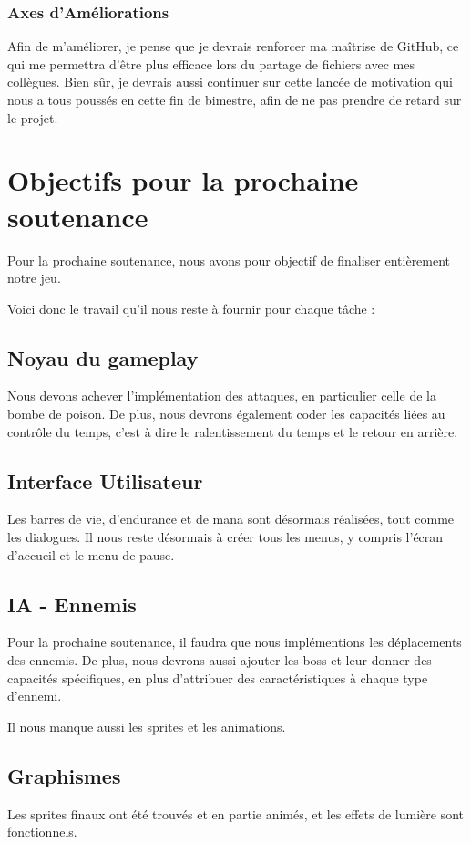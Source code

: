 \documentclass[a4page, 14pt]{extarticle}
\begin{document}
\subsubsection{Axes d'Améliorations}
    {Afin de m'améliorer, je pense que je devrais renforcer ma maîtrise de GitHub, ce qui me permettra d'être plus efficace lors du partage de fichiers avec mes collègues. Bien sûr, je devrais aussi continuer sur cette lancée de motivation qui nous a tous poussés en cette fin de bimestre, afin de ne pas prendre de retard sur le projet.}
\section{Objectifs pour la prochaine soutenance} {
    Pour la prochaine soutenance, nous avons pour objectif de finaliser entièrement notre jeu.
    
    Voici donc le travail qu'il nous reste à fournir pour chaque tâche :
    \subsection{Noyau du gameplay} {
Nous devons achever l'implémentation des attaques, en particulier celle de la bombe de poison. De plus, nous devrons également coder les capacités liées au contrôle du temps, c'est à dire le ralentissement du temps et le retour en arrière.
}
    \subsection{Interface Utilisateur} {
    Les barres de vie, d'endurance et de mana sont désormais réalisées, tout comme les dialogues. Il nous reste désormais à créer tous les menus, y compris l'écran d'accueil et le menu de pause.
    }

    \subsection{IA - Ennemis} {    
    Pour la prochaine soutenance, il faudra que nous implémentions les déplacements des ennemis. De plus, nous devrons aussi ajouter les boss et leur donner des capacités spécifiques, en plus d'attribuer des caractéristiques à chaque type d'ennemi.

    Il nous manque aussi les sprites et les animations.
    }

    \subsection{Graphismes} {
    Les sprites finaux ont été trouvés et en partie animés, et les effets de lumière sont fonctionnels.
    
}}
\end{document}
